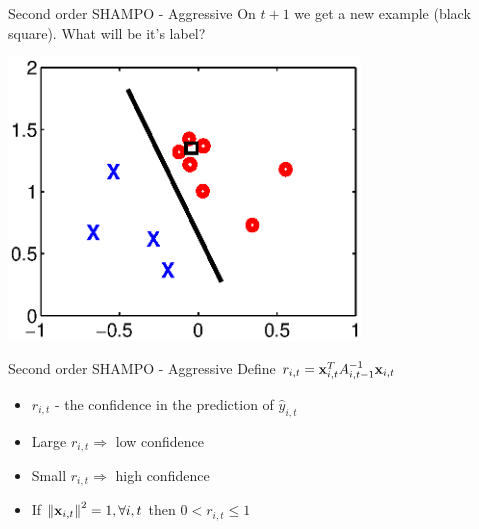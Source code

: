 \documentclass{beamer}
\begin{document}
\begin{frame}{Second order SHAMPO - Aggressive}
On $t+1$ we get a new example (black square). What will be it's label?
\begin{center}
\includegraphics[width=0.7\textwidth]{figs/confidence2.eps}
\end{center}
\end{frame}

\begin{frame}{Second order SHAMPO - Aggressive}
Define $r_{i,t}= \mathbf{x}_{i,t}^TA_{i,t-1}^{-1}\mathbf{x}_{i,t}$  \newline
\begin{itemize}
\item $r_{i,t}$ - the confidence  in the prediction of $\hat{y}_{i,t}$\newline
\item Large $r_{i,t}\Rightarrow$ low confidence \newline
\item Small $r_{i,t}\Rightarrow$ high confidence \newline
\item If $\left\Vert {\mathbf{x}_{i,t}} \right\Vert^2=1, \forall i,t$ then $0<r_{i,t}\le1$
\end{itemize}
\end{frame}

\end{document}

